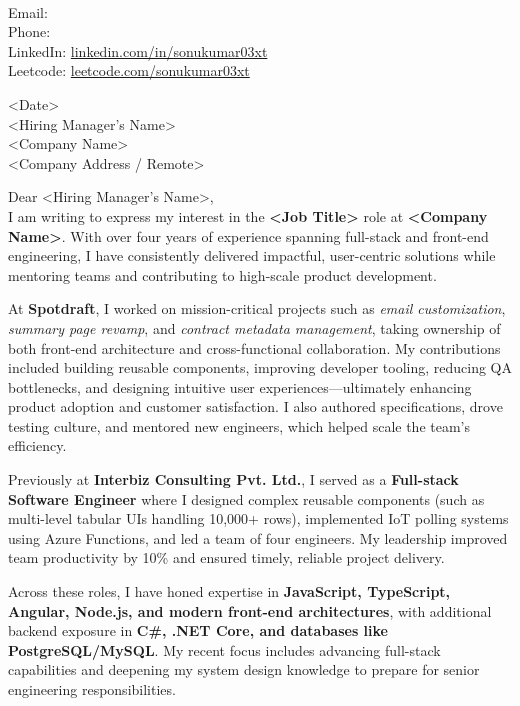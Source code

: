 \documentclass[11pt,a4paper]{article}
\newcommand{\JobTitle}{<Job Title>}
\newcommand{\Company}{<Company Name>}
\newcommand{\Manager}{<Hiring Manager's Name>}
\newcommand{\LetterDate}{<Date>}
\newcommand{\CompanyAddr}{<Company Address / Remote>}
\begin{document}
\begin{flushright}
\textbf{\ContactName} \\
Email: \href{mailto:\ContactEmail}{\ContactEmail} \\
Phone: \ContactPhone \\
LinkedIn: \href{\ContactLinkedIn}{linkedin.com/in/sonukumar03xt} \\
Leetcode: \href{\ContactLeetCode}{leetcode.com/sonukumar03xt} \\
\end{flushright}

\vspace{1cm}

\noindent \LetterDate \\
\Manager \\
\Company \\
\CompanyAddr \\

\vspace{0.5cm}

\noindent Dear \Manager, \\

I am writing to express my interest in the \textbf{\JobTitle} role at \textbf{\Company}. With over four years of experience spanning full-stack and front-end engineering, I have consistently delivered impactful, user-centric solutions while mentoring teams and contributing to high-scale product development.  

At \textbf{Spotdraft}, I worked on mission-critical projects such as \emph{email customization}, \emph{summary page revamp}, and \emph{contract metadata management}, taking ownership of both front-end architecture and cross-functional collaboration. My contributions included building reusable components, improving developer tooling, reducing QA bottlenecks, and designing intuitive user experiences—ultimately enhancing product adoption and customer satisfaction. I also authored specifications, drove testing culture, and mentored new engineers, which helped scale the team’s efficiency.  

Previously at \textbf{Interbiz Consulting Pvt. Ltd.}, I served as a \textbf{Full-stack Software Engineer} where I designed complex reusable components (such as multi-level tabular UIs handling 10,000+ rows), implemented IoT polling systems using Azure Functions, and led a team of four engineers. My leadership improved team productivity by 10\% and ensured timely, reliable project delivery.  

Across these roles, I have honed expertise in \textbf{JavaScript, TypeScript, Angular, Node.js, and modern front-end architectures}, with additional backend exposure in \textbf{C\#, .NET Core, and databases like PostgreSQL/MySQL}. My recent focus includes advancing full-stack capabilities and deepening my system design knowledge to prepare for senior engineering responsibilities.  
\end{document}
